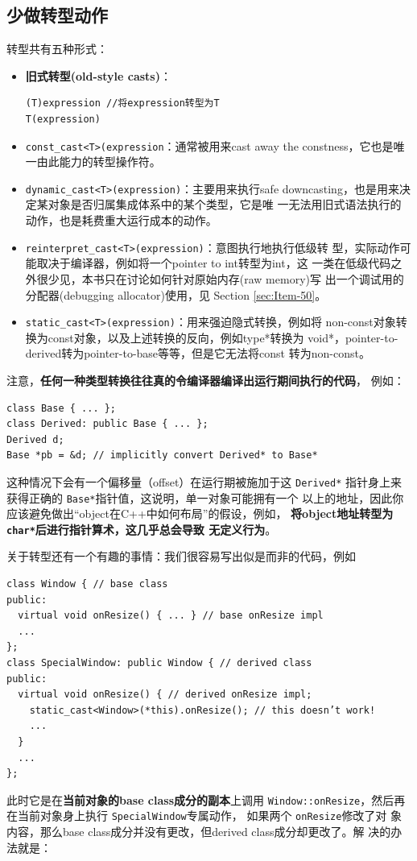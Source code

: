 \documentclass[a4paper,twoside]{article}
\theoremstyle{definition}
\theoremstyle{remark}
\numberwithin{equation}{section}
\let\OldTexttt\texttt
\renewcommand{\texttt}[1]{{\color{blue} \OldTexttt{#1}}}
\begin{document}
\subsection{少做转型动作}
\label{sec:Item-27}

转型共有五种形式：
\begin{itemize}
\item \textbf{旧式转型(old-style casts)}：
\begin{verbatim}
(T)expression //将expression转型为T
T(expression)
\end{verbatim}
\item \texttt{const\_cast<T>(expression}：通常被用来cast away the
  constness，它也是唯一由此能力的转型操作符。
\item \texttt{dynamic\_cast<T>(expression)}：主要用来执行safe
  downcasting，也是用来决定某对象是否归属集成体系中的某个类型，它是唯
  一无法用旧式语法执行的动作，也是耗费重大运行成本的动作。
\item \texttt{reinterpret\_cast<T>(expression)}：意图执行地执行低级转
  型，实际动作可能取决于编译器，例如将一个pointer to int转型为int，这
  一类在低级代码之外很少见，本书只在讨论如何针对原始内存(raw memory)写
  出一个调试用的分配器(debugging allocator)使用，见 Section
  \ref{sec:Item-50}。
\item \texttt{static\_cast<T>(expression)}：用来强迫隐式转换，例如将
  non-const对象转换为const对象，以及上述转换的反向，例如type*转换为
  void*，pointer-to-derived转为pointer-to-base等等，但是它无法将const
  转为non-const。
\end{itemize}

注意，\textbf{任何一种类型转换往往真的令编译器编译出运行期间执行的代码}，
例如：
\begin{verbatim}
class Base { ... };
class Derived: public Base { ... };
Derived d;
Base *pb = &d; // implicitly convert Derived* to Base*
\end{verbatim}
这种情况下会有一个偏移量（offset）在运行期被施加于这\texttt{Derived*}
指针身上来获得正确的\texttt{Base*}指针值，这说明，单一对象可能拥有一个
以上的地址，因此你应该避免做出“object在C++中如何布局”的假设，例如，
\textbf{将object地址转型为\texttt{char*}后进行指针算术，这几乎总会导致
  无定义行为}。

关于转型还有一个有趣的事情：我们很容易写出似是而非的代码，例如
\begin{verbatim}
class Window { // base class
public:
  virtual void onResize() { ... } // base onResize impl
  ...
};
class SpecialWindow: public Window { // derived class
public:
  virtual void onResize() { // derived onResize impl;
    static_cast<Window>(*this).onResize(); // this doesn’t work!
    ...
  }
  ...
};
\end{verbatim}
此时它是在\textbf{当前对象的base class成分的副本}上调用
\texttt{Window::onResize}，然后再在当前对象身上执行
\texttt{SpecialWindow}专属动作， 如果两个\texttt{onResize}修改了对
象内容，那么base class成分并没有更改，但derived class成分却更改了。解
决的办法就是：
\end{document}
